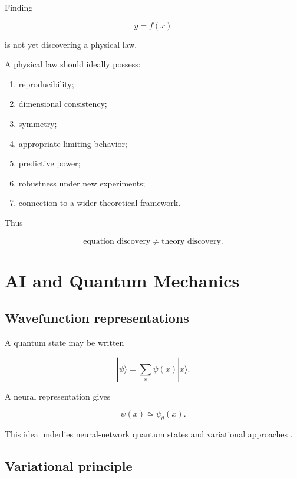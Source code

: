 \documentclass[11pt,a4paper,oneside]{book}
\begin{document}
Finding

\begin{equation}
y=f(x)
\end{equation}

is not yet discovering a physical law.

A physical law should ideally possess:

\begin{enumerate}
\item reproducibility;
\item dimensional consistency;
\item symmetry;
\item appropriate limiting behavior;
\item predictive power;
\item robustness under new experiments;
\item connection to a wider theoretical framework.
\end{enumerate}

Thus

\begin{equation}
\boxed{
\text{equation discovery}
\neq
\text{theory discovery}.
}
\end{equation}

\chapter{AI and Quantum Mechanics}

\section{Wavefunction representations}

A quantum state may be written

\begin{equation}
|\psi\rangle
=
\sum_x\psi(x)|x\rangle.
\end{equation}

A neural representation gives

\begin{equation}
\psi(x)\simeq\psi_\theta(x).
\end{equation}

This idea underlies neural-network quantum states and variational approaches
\citep{Carleo2017,Carleo2019}.

\section{Variational principle}
\end{document}
